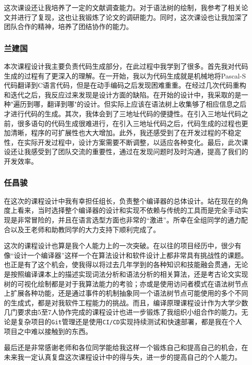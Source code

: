 \documentclass[../main.tex]{subfiles}
\begin{document}
这次课设还让我培养了一定的文献调查能力。对于语法树的绘制，我参考了相关论文并进行了复现，这也让我锻炼了论文的调研能力。同时，这次课设也让我加深了团队合作的精神，培养了团结协作的能力。

\subsubsection{兰建国}

本次课程设计我主要负责代码生成部分，在此过程中我学到了很多。首先我对代码生成的过程有了更深入的理解。在一开始，我以为代码生成就是机械地将Pascal-S代码翻译到C语言代码，但是在动手编码之后发现困难重重。在经过几次代码重构和迭代之后，我反应过来发现是设计方面的缺陷。在开始的设计中，我采取的是一种"遍历到哪，翻译到哪"的设计。但实际上应该在语法树上收集够了相应信息之后才进行代码的生成。其次，我体会到了三地址代码的便捷性。在引入三地址代码之前，很多语句的代码生成很难进行，在引入三地址代码之后，代码生成的过程也更加清晰，程序的可扩展性也大大增加。此外，我还感受到了在开发过程的不稳定性，在实际开发过程中，设计方案需要不断调整，以适应各种变化。最后，此次课设还让我感受到了团队交流的重要性，通过在发现问题时及时沟通，提高了我们的开发效率。

\subsubsection{任昌骏}

在这次的课程设计中我有幸担任组长，负责整个编译器的总体设计。站在现在的角度上看来，当时选择整个编译器的设计和实现不依赖与传统的工具而是完全手动实现是非常冒险的，并且在语言选型方面也非常的``激进''。所幸在全组同学的通力配合以及王老师和助教同学的大力支持下顺利完成了。

这次的课程设计也算是我个人能力上的一次突破。在以往的项目经历中，很少有像``设计一个编译器''这样一个在算法设计和软件设计上都非常具有挑战性的课题。也正是有了这个机会，使我得以将过去几年学到的各种知识和技能融会贯通，无论是按照编译课本上的描述实现词法分析和语法分析的相关算法，还是考古论文实现树的可视化绘制都是对于我算法能力的考验；亦或是使用访问者模式在语法树节点上扩展各种功能，还是通过事件的机制抽象同一个语法树节点可能使用的多个不同的生成式，都是对我软件工程能力的挑战。而且，编译原理课程设计作为大学少数几门要求由5至7人协作完成的课程设计也进一步锻炼了我组织小组合作的能力。无论是复杂项目的\texttt{Git}管理还是使用\texttt{CI/CD}实现持续测试和快速部署，都是我在个人项目之中难以接触到的东西。

最后还是非常感谢老师和各位同学能给我这样一个锻炼自己和提高自己的机会，在未来我一定认真复盘这次课程设计中的得与失，进一步的提高自己的个人能力。
\end{document}
